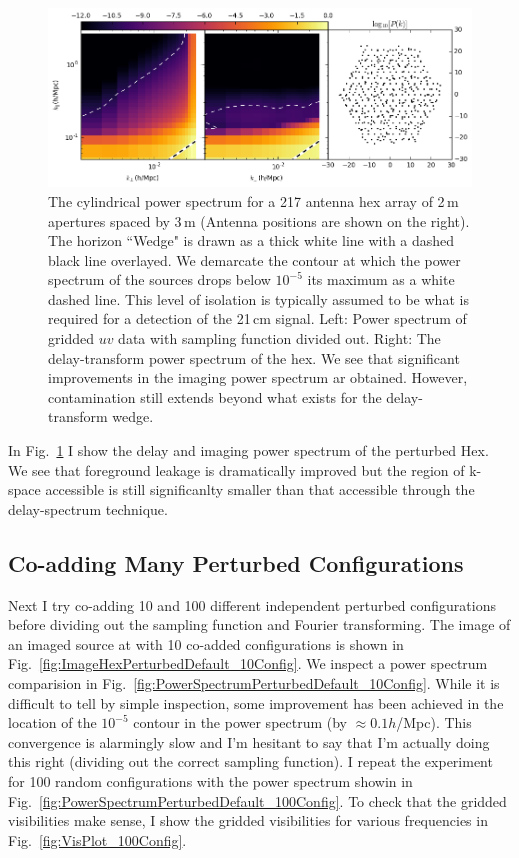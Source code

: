 \documentclass[a4paper,fleqn,usenatbib]{mnras}
\begin{document}
\begin{figure}
\includegraphics[width=\textwidth]{power_spectrum_hex_217_dAnt_2_dAntPos_3_perturbedHex_1config.png}
\caption{The cylindrical power spectrum for a 217 antenna hex array of 2\,m apertures spaced by 3\,m (Antenna positions are shown on the right). The horizon ``Wedge" is drawn as a thick white line with a dashed black line overlayed. We demarcate the contour at which the power spectrum of the sources drops below $10^{-5}$ its maximum as a white dashed line. This level of isolation is typically assumed to be what is required for a detection of the 21\,cm signal. Left: Power spectrum of gridded $uv$ data with sampling function divided out. Right: The delay-transform power spectrum of the hex. We see that significant improvements in the imaging power spectrum ar obtained. However, contamination still extends beyond what exists for the delay-transform wedge. }
\label{fig:PowerSpectrumPerturbedDefault}
\end{figure}

In Fig.~\ref{fig:PowerSpectrumPerturbedDefault} I show the delay and imaging power spectrum of the perturbed Hex. We see that foreground leakage is dramatically improved but the region of k-space accessible is still significanlty smaller than that accessible through the delay-spectrum technique. 

\subsection{Co-adding Many Perturbed Configurations}
 Next I try co-adding 10 and 100 different independent perturbed configurations before dividing out the sampling function and Fourier transforming. The image of an imaged source at with 10 co-added configurations is shown in Fig.~\ref{fig:ImageHexPerturbedDefault_10Config}. We inspect a power spectrum comparision in Fig.~\ref{fig:PowerSpectrumPerturbedDefault_10Config}. While it is difficult to tell by simple inspection, some improvement has been achieved in the location of the $10^{-5}$ contour in the power spectrum (by $\approx 0.1 h$/Mpc). This convergence is alarmingly slow and I'm hesitant to say that I'm actually doing this right (dividing out the correct sampling function). I repeat the experiment for 100 random configurations with the power spectrum showin in Fig.~\ref{fig:PowerSpectrumPerturbedDefault_100Config}. To check that the gridded visibilities make sense, I show the gridded visibilities for various frequencies in Fig.~\ref{fig:VisPlot_100Config}.
\end{document}
